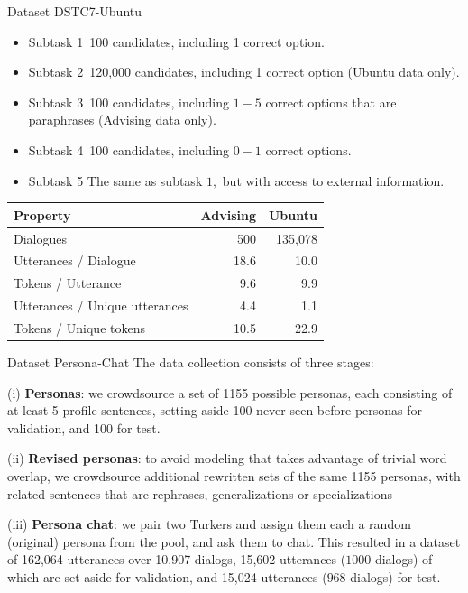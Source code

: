 \documentclass{beamer}
\begin{document}
\begin{frame}{Dataset DSTC7-Ubuntu}
    \begin{itemize}
        \item Subtask 1\ 100 candidates, including 1 correct option.
\item Subtask 2\ 120,000 candidates, including 1 correct option (Ubuntu data only).

\item Subtask 3\ 100 candidates, including $1-5$ correct options that are paraphrases (Advising data only).
\item Subtask 4\ 100 candidates, including $0-1$ correct options.
\item Subtask 5 The same as subtask $1,$ but with access to external information.
    \end{itemize}
    
    \begin{center}\tiny
        \begin{tabular}{lrr}
\hline Property & Advising & Ubuntu \\
\hline \hline Dialogues & 500 & 135,078 \\
Utterances / Dialogue & 18.6 & 10.0 \\
Tokens / Utterance & 9.6 & 9.9 \\
Utterances / Unique utterances & 4.4 & 1.1 \\
Tokens / Unique tokens & 10.5 & 22.9 \\
\hline
\end{tabular}
    \end{center}
\end{frame}

\begin{frame}{Dataset Persona-Chat}
The data collection consists of three stages:

(i) \textbf{Personas}: we crowdsource a set of 1155 possible personas, each consisting of at least 5 profile sentences, setting aside 100 never seen before personas for validation, and 100 for test.


(ii) \textbf{Revised personas}: to avoid modeling that takes advantage of trivial word overlap, we crowdsource additional rewritten sets of the same 1155 personas, with related sentences that are rephrases, generalizations or specializations


(iii) \textbf{Persona chat}: we pair two Turkers and assign them each a random (original) persona from the pool, and ask them to chat. This resulted in a dataset of 162,064 utterances over 10,907 dialogs, 15,602 utterances ($1000$ dialogs) of which are set aside for validation, and 15,024 utterances ($968$ dialogs) for test.
\end{frame}
\end{document}
